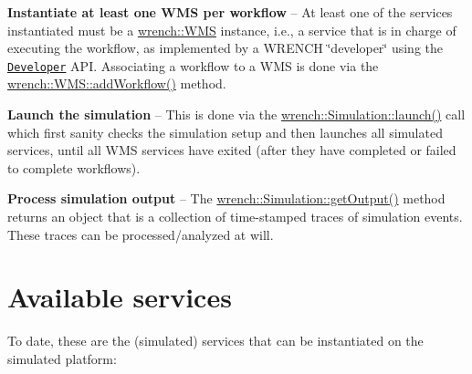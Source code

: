 \begin{DoxyEnumerate}
\item {\bfseries Instantiate at least one W\+MS per workflow} -- At least one of the services instantiated must be a {\ttfamily \hyperlink{classwrench_1_1_w_m_s}{wrench\+::\+W\+MS}} instance, i.\+e., a service that is in charge of executing the workflow, as implemented by a W\+R\+E\+N\+CH \char`\"{}developer\char`\"{} using the \href{../developer/wrench-101.html}{\tt Developer} A\+PI. Associating a workflow to a W\+MS is done via the {\ttfamily \hyperlink{classwrench_1_1_w_m_s_afd2a6ae2f4d792046a6a17d5c0dc313f}{wrench\+::\+W\+M\+S\+::add\+Workflow()}} method.
\item {\bfseries Launch the simulation} -- This is done via the {\ttfamily \hyperlink{classwrench_1_1_simulation_ae9589632de9a2311ed1d7f7747478985}{wrench\+::\+Simulation\+::launch()}} call which first sanity checks the simulation setup and then launches all simulated services, until all W\+MS services have exited (after they have completed or failed to complete workflows).
\item {\bfseries Process simulation output} -- The {\ttfamily \hyperlink{classwrench_1_1_simulation_aff0338aa6831c6ac252cf0673fe68f44}{wrench\+::\+Simulation\+::get\+Output()}} method returns an object that is a collection of time-\/stamped traces of simulation events. These traces can be processed/analyzed at will.
\end{DoxyEnumerate}\hypertarget{wrench-101_wrench-101-simulator-services}{}\section{Available services}\label{wrench-101_wrench-101-simulator-services}
To date, these are the (simulated) services that can be instantiated on the simulated platform\+:


